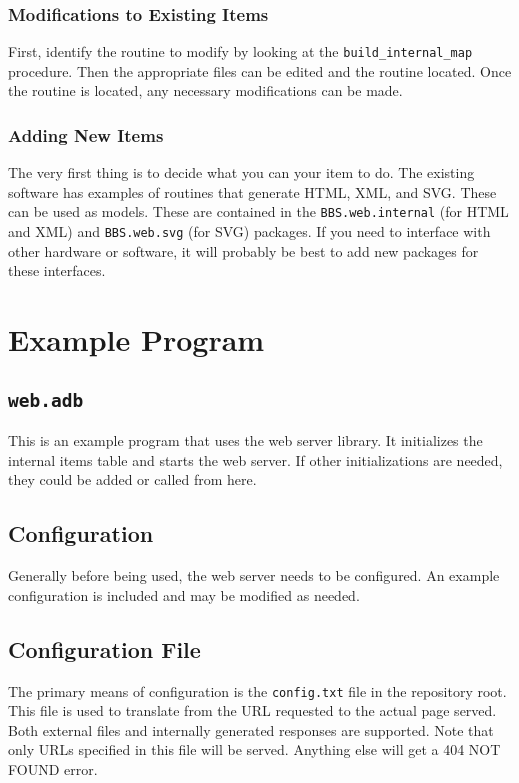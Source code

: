 \documentclass[10pt, openany]{book}
\newcommand{\package}[1]{\texttt{#1}}
\newcommand{\function}[1]{\texttt{#1}}
\newcommand{\filename}[1]{\texttt{#1}}
\begin{document}
\subsection{Modifications to Existing Items}
First, identify the routine to modify by looking at the \function{build\_internal\_map} procedure.  Then the appropriate files can be edited and the routine located.  Once the routine is located, any necessary modifications can be made.

\subsection{Adding New Items}
The very first thing is to decide what you can your item to do.  The existing software has examples of routines that generate HTML, XML, and SVG.  These can be used as models.  These are contained in the \package{BBS.web.internal} (for HTML and XML) and \package{BBS.web.svg} (for SVG) packages.  If you need to interface with other hardware or software, it will probably be best to add new packages for these interfaces.

\chapter{Example Program}
\section{\package{web.adb}}
This is an example program that uses the web server library.  It initializes the internal items table and starts the web server.  If other initializations are needed, they could be added or called from here.


\section{Configuration}
Generally before being used, the web server needs to be configured.  An example configuration is included and may be modified as needed.

\section{Configuration File}
The primary means of configuration is the \filename{config.txt} file in the repository root.  This file is used to translate from the URL requested to the actual page served.  Both external files and internally generated responses are supported.  Note that only URLs specified in this file will be served.  Anything else will get a 404 NOT FOUND error.
\end{document}
